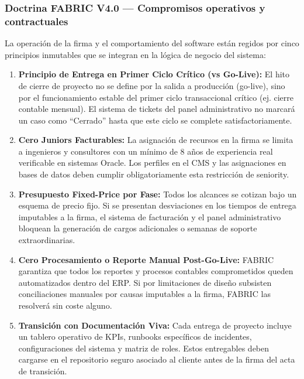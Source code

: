 \documentclass[11pt,letterpaper]{article}
\begin{document}
\subsubsection{Doctrina FABRIC V4.0 — Compromisos operativos y contractuales}
La operación de la firma y el comportamiento del software están regidos por cinco principios inmutables que se integran en la lógica de negocio del sistema:
\begin{enumerate}
\item \textbf{Principio de Entrega en Primer Ciclo Crítico (vs Go-Live):} El hito de cierre de proyecto no se define por la salida a producción (go-live), sino por el funcionamiento estable del primer ciclo transaccional crítico (ej. cierre contable mensual). El sistema de tickets del panel administrativo no marcará un caso como ``Cerrado'' hasta que este ciclo se complete satisfactoriamente.
\item \textbf{Cero Juniors Facturables:} La asignación de recursos en la firma se limita a ingenieros y consultores con un mínimo de 8 años de experiencia real verificable en sistemas Oracle. Los perfiles en el CMS y las asignaciones en bases de datos deben cumplir obligatoriamente esta restricción de seniority.
\item \textbf{Presupuesto Fixed-Price por Fase:} Todos los alcances se cotizan bajo un esquema de precio fijo. Si se presentan desviaciones en los tiempos de entrega imputables a la firma, el sistema de facturación y el panel administrativo bloquean la generación de cargos adicionales o semanas de soporte extraordinarias.
\item \textbf{Cero Procesamiento o Reporte Manual Post-Go-Live:} FABRIC garantiza que todos los reportes y procesos contables comprometidos queden automatizados dentro del ERP. Si por limitaciones de diseño subsisten conciliaciones manuales por causas imputables a la firma, FABRIC las resolverá sin coste alguno.
\item \textbf{Transición con Documentación Viva:} Cada entrega de proyecto incluye un tablero operativo de KPIs, runbooks específicos de incidentes, configuraciones del sistema y matriz de roles. Estos entregables deben cargarse en el repositorio seguro asociado al cliente antes de la firma del acta de transición.
\end{enumerate}
\end{document}
